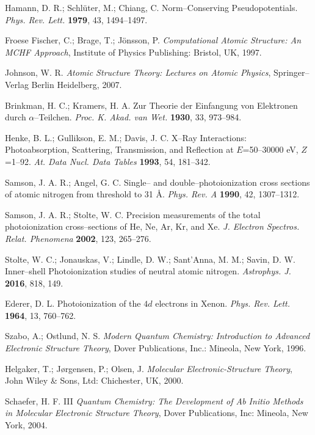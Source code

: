 \documentclass[10pt]{article}
\begin{document}
\begin{thebibliography}{10}
Hamann, D. R.; Schl\"uter, M.; Chiang, C.
Norm--Conserving Pseudopotentials.
{\it Phys. Rev. Lett.} {\bf 1979}, 43, 1494--1497.

Froese Fischer, C.; Brage, T.; J\"onsson, P.
{\it Computational Atomic Structure: An MCHF Approach},
Institute of Physics Publishing: Bristol, UK, 1997.

Johnson, W. R. 
{\it Atomic Structure Theory: Lectures on Atomic Physics},
Springer--Verlag Berlin Heidelberg, 2007.

Brinkman, H. C.; Kramers, H. A.
Zur Theorie der Einfangung von Elektronen durch $\alpha$--Teilchen.
{\it Proc. K. Akad. van Wet.} {\bf 1930}, 33, 973--984.

Henke, B. L.; Gullikson, E. M.; Davis, J. C. 
X--Ray Interactions: Photoabsorption, Scattering, Transmission, and Reflection at $E$=50--30000 eV, $Z$=1--92.
{\it At. Data Nucl. Data Tables} {\bf 1993}, 54, 181--342.

Samson, J. A. R.; Angel, G. C.
Single-- and double--photoionization cross sections of atomic nitrogen from threshold to 31 \AA.
{\it Phys. Rev. A} {\bf 1990}, 42, 1307--1312.

Samson, J. A. R.; Stolte, W. C.
Precision measurements of the total photoionization cross--sections of He, Ne, Ar, Kr, and Xe.
{\it J. Electron Spectros. Relat. Phenomena} {\bf 2002}, 123, 265--276.

Stolte, W. C.; Jonauskas, V.; Lindle, D. W.; Sant'Anna, M. M.; Savin, D. W. 
Inner--shell Photoionization studies of neutral atomic nitrogen.
{\it Astrophys. J.} {\bf 2016}, 818, 149.

Ederer, D. L. 
Photoionization of the $4d$ electrons in Xenon.
{\it Phys. Rev. Lett.} {\bf 1964}, 13, 760--762.

Szabo, A.; Ostlund, N. S.
{\it Modern Quantum Chemistry: Introduction to Advanced Electronic 
Structure Theory},
Dover Publications, Inc.: Mineola, New York, 1996.

Helgaker, T.; J{\o}rgensen, P.; Olsen, J.
{\it Molecular Electronic-Structure Theory},
John Wiley {\&} Sons, Ltd: Chichester, UK, 2000.

Schaefer, H. F. III
{\it Quantum Chemistry: The Development of Ab Initio Methods in
Molecular Electronic Structure Theory},
Dover Publications, Inc: Mineola, New York, 2004.


\end{thebibliography}
\end{document}
